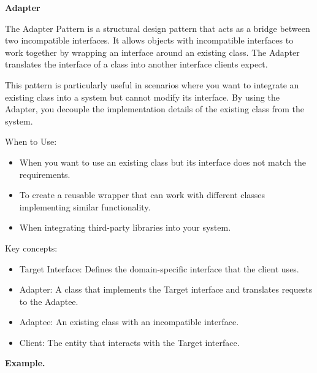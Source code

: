 \medskip
\begin{center}
\textbf{Adapter}
\end{center}

The Adapter Pattern is a structural design pattern that acts as a bridge between two incompatible interfaces. It allows objects with incompatible interfaces to work together by wrapping an interface around an existing class. The Adapter translates the interface of a class into another interface clients expect.

This pattern is particularly useful in scenarios where you want to integrate an existing class into a system but cannot modify its interface. By using the Adapter, you decouple the implementation details of the existing class from the system.

When to Use:

\begin{itemize}
\item When you want to use an existing class but its interface does not match the requirements.

\item To create a reusable wrapper that can work with different classes implementing similar functionality.

\item When integrating third-party libraries into your system.
\end{itemize}


Key concepts:

\begin{itemize}
\item Target Interface: Defines the domain-specific interface that the client uses.

\item Adapter: A class that implements the Target interface and translates requests to the Adaptee.

\item Adaptee: An existing class with an incompatible interface.

\item Client: The entity that interacts with the Target interface.
\end{itemize}

\textbf{Example.}

